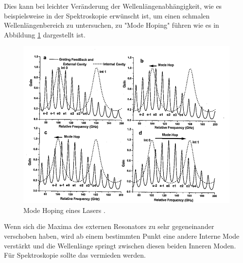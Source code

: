 Dies kann bei leichter Veränderung der Wellenlängenabhängigkeit, wie es beispielsweise in der Spektroskopie erwünscht ist, um einen schmalen 
Wellenlängenbereich zu untersuchen, zu "Mode Hoping" führen wie es in Abbildung \ref{fig:Moden2} dargestellt ist.
\begin{figure}[H]
    \centering
    \includegraphics[scale=0.8]{pictures/Moden2.png}
    \caption{Mode Hoping eines Lasers \cite{teachspin}.}
    \label{fig:Moden2}
\end{figure}
\noindent Wenn sich die Maxima des externen Resonators zu sehr gegeneinander verschoben haben, wird ab einem bestimmten Punkt eine andere Interne Mode verstärkt und 
die Wellenlänge springt zwischen diesen beiden Inneren Moden. Für Spektroskopie sollte das vermieden werden.
